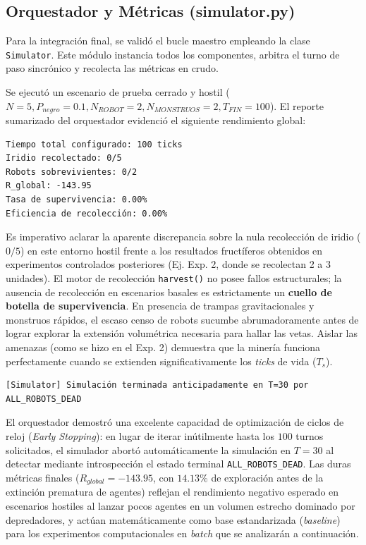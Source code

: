 \documentclass[conference]{IEEEtran}
\begin{document}
\subsection{Orquestador y Métricas (simulator.py)}
Para la integración final, se validó el bucle maestro empleando la clase \texttt{Simulator}. Este módulo instancia todos los componentes, arbitra el turno de paso sincrónico y recolecta las métricas en crudo.

Se ejecutó un escenario de prueba cerrado y hostil ($N=5, P_{negro}=0.1, N_{ROBOT}=2, N_{MONSTRUOS}=2, T_{FIN}=100$). El reporte sumarizado del orquestador evidenció el siguiente rendimiento global:

{\scriptsize
\begin{verbatim}
Tiempo total configurado: 100 ticks
Iridio recolectado: 0/5
Robots sobrevivientes: 0/2
R_global: -143.95
Tasa de supervivencia: 0.00%
Eficiencia de recolección: 0.00%
\end{verbatim}
}

Es imperativo aclarar la aparente discrepancia sobre la nula recolección de iridio ($0/5$) en este entorno hostil frente a los resultados fructíferos obtenidos en experimentos controlados posteriores (Ej. Exp. 2, donde se recolectan 2 a 3 unidades). El motor de recolección \texttt{harvest()} no posee fallos estructurales; la ausencia de recolección en escenarios basales es estrictamente un \textbf{cuello de botella de supervivencia}. En presencia de trampas gravitacionales y monstruos rápidos, el escaso censo de robots sucumbe abrumadoramente antes de lograr explorar la extensión volumétrica necesaria para hallar las vetas. Aislar las amenazas (como se hizo en el Exp. 2) demuestra que la minería funciona perfectamente cuando se extienden significativamente los \textit{ticks} de vida ($T_s$).

\begin{verbatim}
[Simulator] Simulación terminada anticipadamente en T=30 por ALL_ROBOTS_DEAD
\end{verbatim}

El orquestador demostró una excelente capacidad de optimización de ciclos de reloj (\textit{Early Stopping}): en lugar de iterar inútilmente hasta los $100$ turnos solicitados, el simulador abortó automáticamente la simulación en $T=30$ al detectar mediante introspección el estado terminal \texttt{ALL\_ROBOTS\_DEAD}. Las duras métricas finales ($R_{global} = -143.95$, con $14.13\%$ de exploración antes de la extinción prematura de agentes) reflejan el rendimiento negativo esperado en escenarios hostiles al lanzar pocos agentes en un volumen estrecho dominado por depredadores, y actúan matemáticamente como base estandarizada (\textit{baseline}) para los experimentos computacionales en \textit{batch} que se analizarán a continuación.
\end{document}

